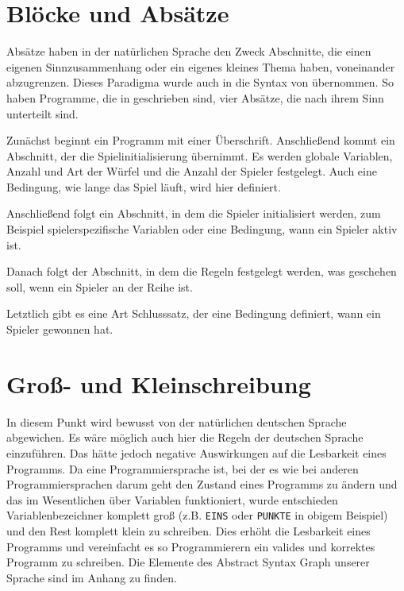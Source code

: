 \section{Blöcke und Absätze}
\label{sec:blocke_und_absatze}
	Absätze haben in der natürlichen Sprache den Zweck Abschnitte, die einen eigenen Sinnzusammenhang oder ein eigenes kleines Thema haben, voneinander abzugrenzen. Dieses Paradigma wurde auch in die Syntax von \dg übernommen. So haben Programme, die in \dg geschrieben sind, vier Absätze, die nach ihrem Sinn unterteilt sind.

	Zunächst beginnt ein Programm mit einer Überschrift. Anschließend kommt ein Abschnitt, der die Spielinitialisierung übernimmt. Es werden globale Variablen, Anzahl und Art der Würfel und die Anzahl der Spieler festgelegt. Auch eine Bedingung, wie lange das Spiel läuft, wird hier definiert.

	Anschließend folgt ein Abschnitt, in dem die Spieler initialisiert werden, zum Beispiel spielerspezifische Variablen oder eine Bedingung, wann ein Spieler aktiv ist.

	Danach folgt der Abschnitt, in dem die Regeln festgelegt werden, was geschehen soll, wenn ein Spieler an der Reihe ist.

	Letztlich gibt es eine Art Schlusssatz, der eine Bedingung definiert, wann ein Spieler gewonnen hat.

\section{Groß- und Kleinschreibung}
\label{sec:gross_und_kleinschreibung}
	In diesem Punkt wird bewusst von der natürlichen deutschen Sprache abgewichen. Es wäre möglich auch hier die Regeln der deutschen Sprache einzuführen. Das hätte jedoch negative Auswirkungen auf die Lesbarkeit eines Programms. Da \dg eine Programmiersprache ist, bei der es wie bei anderen Programmiersprachen darum geht den Zustand eines Programms zu ändern und das im Wesentlichen über Variablen funktioniert, wurde entschieden Variablenbezeichner komplett groß (z.B. \texttt{EINS} oder \texttt{PUNKTE} in obigem Beispiel) und den Rest komplett klein zu schreiben. Dies erhöht die Lesbarkeit eines Programms und vereinfacht es so Programmierern ein valides und korrektes Programm zu schreiben. Die Elemente des Abstract Syntax Graph unserer Sprache sind im Anhang zu finden. 